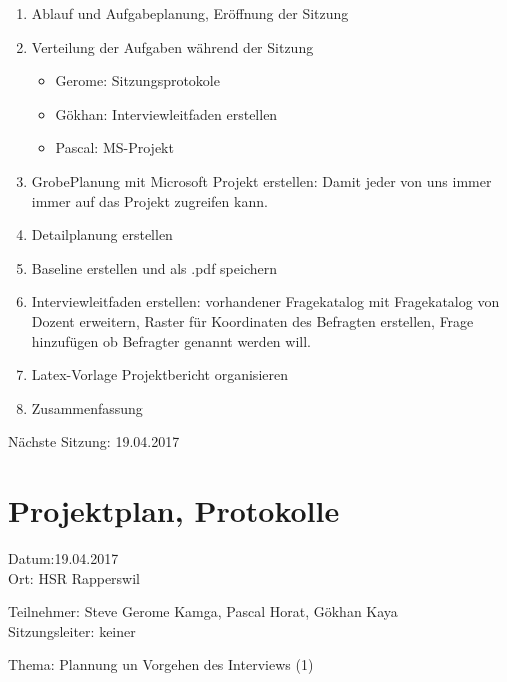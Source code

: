 \begin{enumerate}

\item Ablauf und Aufgabeplanung, Eröffnung der Sitzung 

\item  Verteilung der Aufgaben während der Sitzung
\begin{itemize}
\item Gerome: Sitzungsprotokole
\item Gökhan: Interviewleitfaden erstellen
\item Pascal: MS-Projekt
\end{itemize}

\item GrobePlanung mit Microsoft Projekt erstellen: Damit jeder von uns immer immer auf das Projekt zugreifen kann.

\item Detailplanung erstellen

\item Baseline erstellen und als .pdf speichern

\item Interviewleitfaden erstellen: vorhandener Fragekatalog mit Fragekatalog von Dozent erweitern, Raster für Koordinaten des Befragten erstellen, Frage hinzufügen ob Befragter genannt werden will.

\item Latex-Vorlage Projektbericht organisieren

\item Zusammenfassung

\end{enumerate}

Nächste Sitzung: 19.04.2017

\newpage
\section*{Projektplan, Protokolle}

Datum:19.04.2017\\
Ort: HSR Rapperswil

Teilnehmer: Steve Gerome Kamga, Pascal Horat, Gökhan Kaya\\
Sitzungsleiter: keiner

Thema: Plannung un Vorgehen des Interviews (1)


